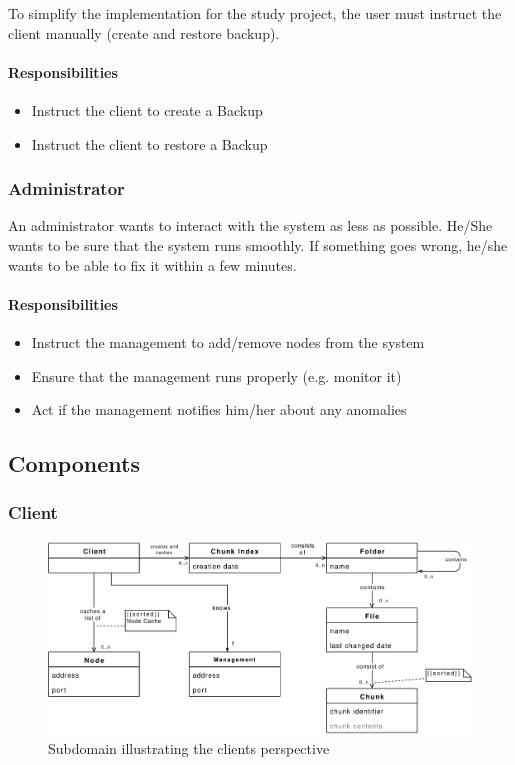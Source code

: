 To simplify the implementation for the study project, the \gls{user} must instruct the \gls{client} manually (create and restore backup).

\paragraph{Responsibilities}
\begin{itemize}
    \item Instruct the \gls{client} to create a Backup
    \item Instruct the \gls{client} to restore a Backup
\end{itemize}


\subsubsection{Administrator}
An \gls{administrator} wants to interact with the \gls{system} as less as possible. He/She wants to be sure that the \gls{system} runs smoothly. If something goes wrong, he/she wants to be able to fix it within a few minutes.

\paragraph{Responsibilities}
\begin{itemize}
    \item Instruct the \gls{management} to add/remove \glspl{node} from the \gls{system}
    \item Ensure that the \gls{management} runs properly (e.g. monitor it)
    \item Act if the \gls{management} notifies him/her about any anomalies
\end{itemize}

\subsection{Components}

\subsubsection{Client}\label{sec:component-client}

\begin{figure}[h]
    \centering
    \includegraphics[width=1\linewidth]{resources/client_domain_model}
    \caption[Client Subdomain]{Subdomain illustrating the \glspl{client} perspective}
\end{figure}

